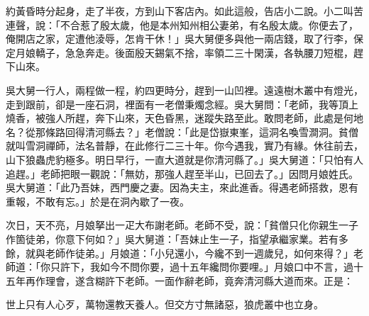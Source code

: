 約黃昏時分起身，走了半夜，方到山下客店內。{}如此這般，告店小二說。小二叫苦連聲，說：「不合惹了殷太歲，他是本州知州相公妻弟，有名殷太歲。你便去了，俺開店之家，定遭他淩辱，怎肯干休！」吳大舅便多與他一兩店錢，取了行李，保定月娘轎子，急急奔走。後面殷天錫氣不捨，率領二三十閑漢，各執腰刀短棍，趕下山來。

吳大舅一行人，兩程做一程，約四更時分，趕到一山凹裡。遠遠樹木叢中有燈光，走到跟前，卻是一座石洞，裡面有一老僧秉燭念經。吳大舅問：「老師，我等頂上燒香，被強人所趕，奔下山來，天色昏黑，迷蹤失路至此。敢問老師，此處是何地名？從那條路回得清河縣去？」老僧說：「此是岱嶽東峯，這洞名喚雪澗洞。貧僧就叫雪洞禪師，法名普靜，在此修行二三十年。你今遇我，實乃有緣。休往前去，山下狼蟲虎豹極多。明日早行，一直大道就是你清河縣了。」吳大舅道：「只怕有人追趕。」老師把眼一觀說：「無妨，那強人趕至半山，已回去了。」因問月娘姓氏。吳大舅道：「此乃吾妹，西門慶之妻。因為夫主，來此進香。得遇老師搭救，恩有重報，不敢有忘。」於是在洞內歇了一夜。

次日，天不亮，月娘拏出一疋大布謝老師。老師不受，說：「貧僧只化你親生一子作箇徒弟，你意下何如？」{}吳大舅道：「吾妹止生一子，指望承繼家業。若有多餘，就與老師作徒弟。」月娘道：「小兒還小，今纔不到一週歲兒，如何來得？」老師道：「你只許下，我如今不問你要，過十五年纔問你要哩。」月娘口中不言，過十五年再作理會，遂含糊許下老師。一面作辭老師，竟奔清河縣大道而來。正是：

\begin{myquote}
世上只有人心歹，萬物還教天養人。但交方寸無諸惡，狼虎叢中也立身。
\end{myquote}


